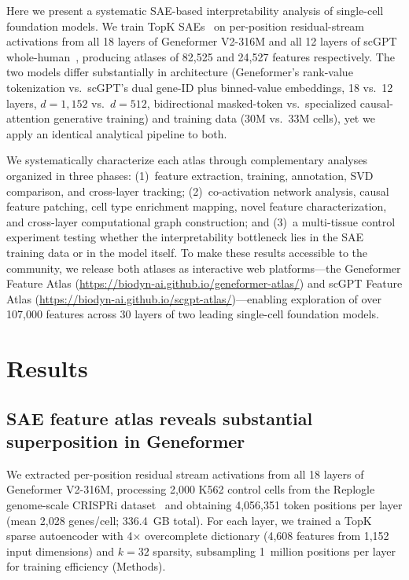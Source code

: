 \documentclass[onecolumn]{article}
\begin{document}
Here we present a systematic SAE-based interpretability analysis of single-cell foundation models. We train TopK SAEs~\cite{makhzani2013ksparse} on per-position residual-stream activations from all 18 layers of Geneformer V2-316M and all 12 layers of scGPT whole-human~\cite{cui2024scgpt}, producing atlases of 82,525 and 24,527 features respectively. The two models differ substantially in architecture (Geneformer's rank-value tokenization vs.\ scGPT's dual gene-ID plus binned-value embeddings, 18 vs.\ 12 layers, $d{=}1{,}152$ vs.\ $d{=}512$, bidirectional masked-token vs.\ specialized causal-attention generative training) and training data (30M vs.\ 33M cells), yet we apply an identical analytical pipeline to both.

We systematically characterize each atlas through complementary analyses organized in three phases: (1)~feature extraction, training, annotation, SVD comparison, and cross-layer tracking; (2)~co-activation network analysis, causal feature patching, cell type enrichment mapping, novel feature characterization, and cross-layer computational graph construction; and (3)~a multi-tissue control experiment testing whether the interpretability bottleneck lies in the SAE training data or in the model itself. To make these results accessible to the community, we release both atlases as interactive web platforms---the Geneformer Feature Atlas (\url{https://biodyn-ai.github.io/geneformer-atlas/}) and scGPT Feature Atlas (\url{https://biodyn-ai.github.io/scgpt-atlas/})---enabling exploration of over 107,000 features across 30 layers of two leading single-cell foundation models.


\section{Results}

\subsection{SAE feature atlas reveals substantial superposition in Geneformer}
\label{sec:atlas}

We extracted per-position residual stream activations from all 18 layers of Geneformer V2-316M, processing 2,000 K562 control cells from the Replogle genome-scale CRISPRi dataset~\cite{replogle2022mapping} and obtaining 4,056,351 token positions per layer (mean 2,028 genes/cell; 336.4~GB total). For each layer, we trained a TopK sparse autoencoder with 4$\times$ overcomplete dictionary (4,608 features from 1,152 input dimensions) and $k{=}32$ sparsity, subsampling 1~million positions per layer for training efficiency (Methods).
\end{document}

